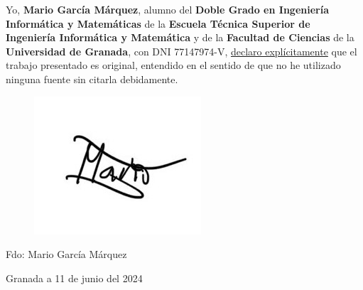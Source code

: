 \documentclass[oneside,openright,titlepage,numbers=noenddot,openany,headinclude,footinclude=true,
cleardoublepage=empty,abstractoff,BCOR=5mm,paper=a4,fontsize=12pt,main=spanish]{scrreprt}
\begin{document}
\vspace{10em}




Yo, \textbf{Mario García Márquez}, alumno del \textbf{Doble Grado en Ingeniería Informática y Matemáticas} de la \textbf{Escuela Técnica Superior de Ingeniería Informática y Matemática} y de la \textbf{Facultad de Ciencias} de la \textbf{Universidad de Granada}, con DNI 77147974-V, \underline{declaro explícitamente} que el trabajo presentado es original, entendido en el sentido de que no he utilizado ninguna fuente sin citarla debidamente.

\vspace{25em}

\begin{figure}[H]
\hspace{4em}
    \includegraphics[scale = 0.6]{firma_mario.jpg}
\end{figure}

Fdo: Mario García Márquez

\begin{flushright}
 Granada a 11 de junio \hspace{0.1em} del  2024
\end{flushright}


\end{document}

